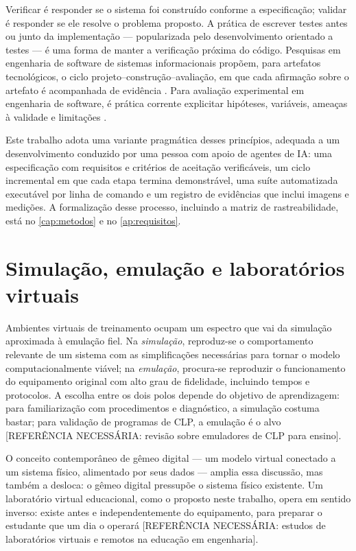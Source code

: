 Verificar é responder se o sistema foi construído conforme a especificação;
validar é responder se ele resolve o problema proposto. A prática de escrever
testes antes ou junto da implementação --- popularizada pelo desenvolvimento
orientado a testes \cite{beck2002tdd} --- é uma forma de manter a verificação
próxima do código. Pesquisas em engenharia de software de sistemas
informacionais propõem, para artefatos tecnológicos, o ciclo
projeto--construção--avaliação, em que cada afirmação sobre o artefato é
acompanhada de evidência \cite{hevner2004design}. Para avaliação experimental
em engenharia de software, é prática corrente explicitar hipóteses, variáveis,
ameaças à validade e limitações \cite{wohlin2012experimentation}.

Este trabalho adota uma variante pragmática desses princípios, adequada a um
desenvolvimento conduzido por uma pessoa com apoio de agentes de IA: uma
especificação com requisitos e critérios de aceitação verificáveis, um ciclo
incremental em que cada etapa termina demonstrável, uma suíte automatizada
executável por linha de comando e um registro de evidências que inclui imagens
e medições. A formalização desse processo, incluindo a matriz de
rastreabilidade, está no \autoref{cap:metodos} e no
\autoref{ap:requisitos}.

\section{Simulação, emulação e laboratórios virtuais}
\label{sec:simulacao}

Ambientes virtuais de treinamento ocupam um espectro que vai da simulação
aproximada à emulação fiel. Na \emph{simulação}, reproduz-se o comportamento
relevante de um sistema com as simplificações necessárias para tornar o modelo
computacionalmente viável; na \emph{emulação}, procura-se reproduzir o
funcionamento do equipamento original com alto grau de fidelidade, incluindo
tempos e protocolos. A escolha entre os dois polos depende do objetivo de
aprendizagem: para familiarização com procedimentos e diagnóstico, a simulação
costuma bastar; para validação de programas de CLP, a emulação é o alvo
[REFERÊNCIA NECESSÁRIA: revisão sobre emuladores de CLP para ensino].

O conceito contemporâneo de gêmeo digital --- um modelo virtual conectado a um
sistema físico, alimentado por seus dados --- amplia essa discussão, mas
também a desloca: o gêmeo digital pressupõe o sistema físico existente. Um
laboratório virtual educacional, como o proposto neste trabalho, opera em
sentido inverso: existe antes e independentemente do equipamento, para
preparar o estudante que um dia o operará [REFERÊNCIA NECESSÁRIA: estudos de
laboratórios virtuais e remotos na educação em engenharia].

